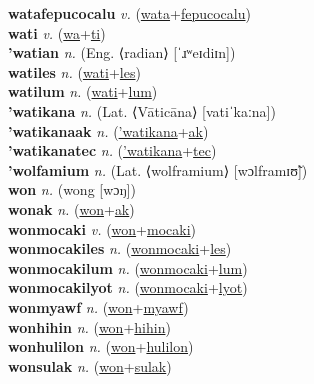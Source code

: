 \textbf{watafepucocalu} \textit{v.} (\hyperref[wata]{wata}+\hyperref[fepucocalu]{fepucocalu})
 \label{watafepucocalu} \\
\textbf{wati} \textit{v.} (\hyperref[wa]{wa}+\hyperref[ti]{ti})
 \label{wati} \\
\textbf{'watian} \textit{n.} (Eng. ⟨radian⟩ [ˈɹʷeɪdiɪn])
 \label{'watian} \\
\textbf{watiles} \textit{n.} (\hyperref[wati]{wati}+\hyperref[les]{les})
 \label{watiles} \\
\textbf{watilum} \textit{n.} (\hyperref[wati]{wati}+\hyperref[lum]{lum})
 \label{watilum} \\
\textbf{'watikana} \textit{n.} (Lat. ⟨Vāticāna⟩ [vatiˈkaːna])
 \label{'watikana} \\
\textbf{'watikanaak} \textit{n.} (\hyperref['watikana]{'watikana}+\hyperref[ak]{ak})
 \label{'watikanaak} \\
\textbf{'watikanatec} \textit{n.} (\hyperref['watikana]{'watikana}+\hyperref[tec]{tec})
 \label{'watikanatec} \\
\textbf{'wolfamium} \textit{n.} (Lat. ⟨wolframium⟩ [wɔlframɪʊ̃])
 \label{'wolfamium} \\
\textbf{won} \textit{n.} ({\javanese{}wong} [wɔŋ])
 \label{won} \\
\textbf{wonak} \textit{n.} (\hyperref[won]{won}+\hyperref[ak]{ak})
 \label{wonak} \\
\textbf{wonmocaki} \textit{v.} (\hyperref[won]{won}+\hyperref[mocaki]{mocaki})
 \label{wonmocaki} \\
\textbf{wonmocakiles} \textit{n.} (\hyperref[wonmocaki]{wonmocaki}+\hyperref[les]{les})
 \label{wonmocakiles} \\
\textbf{wonmocakilum} \textit{n.} (\hyperref[wonmocaki]{wonmocaki}+\hyperref[lum]{lum})
 \label{wonmocakilum} \\
\textbf{wonmocakilyot} \textit{n.} (\hyperref[wonmocaki]{wonmocaki}+\hyperref[lyot]{lyot})
 \label{wonmocakilyot} \\
\textbf{wonmyawf} \textit{n.} (\hyperref[won]{won}+\hyperref[myawf]{myawf})
 \label{wonmyawf} \\
\textbf{wonhihin} \textit{n.} (\hyperref[won]{won}+\hyperref[hihin]{hihin})
 \label{wonhihin} \\
\textbf{wonhulilon} \textit{n.} (\hyperref[won]{won}+\hyperref[hulilon]{hulilon})
 \label{wonhulilon} \\
\textbf{wonsulak} \textit{n.} (\hyperref[won]{won}+\hyperref[sulak]{sulak})
 \label{wonsulak} \\
